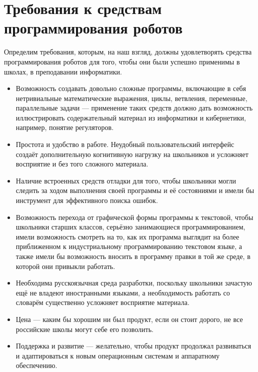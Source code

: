 \documentclass[a4paper]{article}
\begin{document}
\section{Требования к средствам программирования роботов}
Определим требования, которым, на наш взгляд, должны удовлетворять средства программирования роботов для того, чтобы они были успешно применимы в школах, в преподавании информатики.
\begin{itemize}
  \item Возможность создавать довольно сложные программы, включающие в себя нетривиальные математические выражения, циклы, ветвления, переменные, параллельные задачи --- применение таких средств должно дать возможность иллюстрировать содержательный материал из информатики и кибернетики, например, понятие регуляторов.
  \item Простота и удобство в работе. Неудобный пользовательский интерфейс создаёт дополнительную когнитивную нагрузку на школьников и усложняет восприятие и без того сложного материала.
  \item Наличие встроенных средств отладки для того, чтобы школьники могли следить за ходом выполнения своей программы и её состояниями и имели бы инструмент для эффективного поиска ошибок.
  \item Возможность перехода от графической формы программы к текстовой, чтобы школьники старших классов, серьёзно занимающиеся программированием, имели возможность смотреть на то, как их программа выглядит на более приближенном к индустриальному программированию текстовом языке, а также имели бы возможность вносить в программу правки в той же среде, в которой они привыкли работать.
  \item Необходима русскоязычная среда разработки, поскольку школьники зачастую ещё не владеют иностранными языками, а необходимость работать со словарём существенно усложняет восприятие материала.
  \item Цена --- каким бы хорошим ни был продукт, если он стоит дорого, не все российские школы могут себе его позволить.
  \item Поддержка и развитие --- желательно, чтобы продукт продолжал развиваться и адаптироваться к новым операционным системам и аппаратному обеспечению.
\end{itemize}
\end{document}

